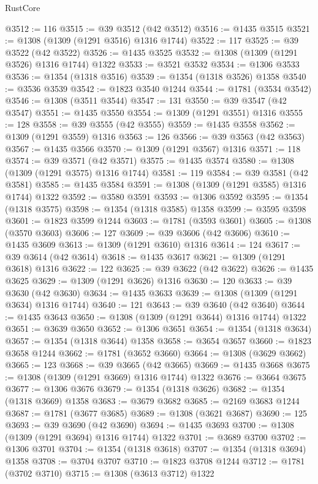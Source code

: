 \begin{lexlean}{RustCore}
\begin{coremodule}
@3512 := 116
@3515 := @39 @3512 (@42 @3512)
@3516 := @1435 @3515
@3521 := @1308 (@1309 (@1291 @3516) @1316 @1744)
@3522 := 117
@3525 := @39 @3522 (@42 @3522)
@3526 := @1435 @3525
@3532 := @1308 (@1309 (@1291 @3526) @1316 @1744) @1322
@3533 := @3521 @3532
@3534 := @1306 @3533
@3536 := @1354 (@1318 @3516)
@3539 := @1354 (@1318 @3526) @1358
@3540 := @3536 @3539
@3542 := @1823 @3540 @1244
@3544 := @1781 (@3534 @3542)
@3546 := @1308 (@3511 @3544)
@3547 := 131
@3550 := @39 @3547 (@42 @3547)
@3551 := @1435 @3550
@3554 := @1309 (@1291 @3551) @1316
@3555 := 128
@3558 := @39 @3555 (@42 @3555)
@3559 := @1435 @3558
@3562 := @1309 (@1291 @3559) @1316
@3563 := 126
@3566 := @39 @3563 (@42 @3563)
@3567 := @1435 @3566
@3570 := @1309 (@1291 @3567) @1316
@3571 := 118
@3574 := @39 @3571 (@42 @3571)
@3575 := @1435 @3574
@3580 := @1308 (@1309 (@1291 @3575) @1316 @1744)
@3581 := 119
@3584 := @39 @3581 (@42 @3581)
@3585 := @1435 @3584
@3591 := @1308 (@1309 (@1291 @3585) @1316 @1744) @1322
@3592 := @3580 @3591
@3593 := @1306 @3592
@3595 := @1354 (@1318 @3575)
@3598 := @1354 (@1318 @3585) @1358
@3599 := @3595 @3598
@3601 := @1823 @3599 @1244
@3603 := @1781 (@3593 @3601)
@3605 := @1308 (@3570 @3603)
@3606 := 127
@3609 := @39 @3606 (@42 @3606)
@3610 := @1435 @3609
@3613 := @1309 (@1291 @3610) @1316
@3614 := 124
@3617 := @39 @3614 (@42 @3614)
@3618 := @1435 @3617
@3621 := @1309 (@1291 @3618) @1316
@3622 := 122
@3625 := @39 @3622 (@42 @3622)
@3626 := @1435 @3625
@3629 := @1309 (@1291 @3626) @1316
@3630 := 120
@3633 := @39 @3630 (@42 @3630)
@3634 := @1435 @3633
@3639 := @1308 (@1309 (@1291 @3634) @1316 @1744)
@3640 := 121
@3643 := @39 @3640 (@42 @3640)
@3644 := @1435 @3643
@3650 := @1308 (@1309 (@1291 @3644) @1316 @1744) @1322
@3651 := @3639 @3650
@3652 := @1306 @3651
@3654 := @1354 (@1318 @3634)
@3657 := @1354 (@1318 @3644) @1358
@3658 := @3654 @3657
@3660 := @1823 @3658 @1244
@3662 := @1781 (@3652 @3660)
@3664 := @1308 (@3629 @3662)
@3665 := 123
@3668 := @39 @3665 (@42 @3665)
@3669 := @1435 @3668
@3675 := @1308 (@1309 (@1291 @3669) @1316 @1744) @1322
@3676 := @3664 @3675
@3677 := @1306 @3676
@3679 := @1354 (@1318 @3626)
@3682 := @1354 (@1318 @3669) @1358
@3683 := @3679 @3682
@3685 := @2169 @3683 @1244
@3687 := @1781 (@3677 @3685)
@3689 := @1308 (@3621 @3687)
@3690 := 125
@3693 := @39 @3690 (@42 @3690)
@3694 := @1435 @3693
@3700 := @1308 (@1309 (@1291 @3694) @1316 @1744) @1322
@3701 := @3689 @3700
@3702 := @1306 @3701
@3704 := @1354 (@1318 @3618)
@3707 := @1354 (@1318 @3694) @1358
@3708 := @3704 @3707
@3710 := @1823 @3708 @1244
@3712 := @1781 (@3702 @3710)
@3715 := @1308 (@3613 @3712) @1322

\end{coremodule}
\end{lexlean}
